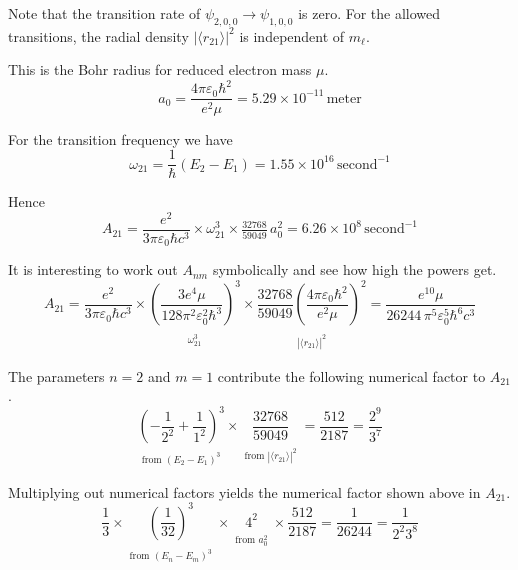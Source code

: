 \documentclass[12pt]{article}
\begin{document}
\medskip
\noindent
Note that the transition rate of $\psi_{2,0,0}\rightarrow\psi_{1,0,0}$ is zero.
For the allowed transitions, the radial density
$|\langle r_{21}\rangle|^2$ is independent of $m_\ell$.

\bigskip
\noindent
This is the Bohr radius for reduced electron mass $\mu$.
\begin{equation*}
a_0=\frac{4\pi\varepsilon_0\hbar^2}{e^2 \mu}
=5.29\times10^{-11}\,\text{meter}
\end{equation*}

\bigskip
\noindent
For the transition frequency we have
\begin{equation*}
\omega_{21}=\frac{1}{\hbar}(E_2-E_1)
=1.55\times10^{16}\,\text{second}^{-1}
\end{equation*}

\noindent
Hence
\begin{equation*}
A_{21}=\frac{e^2}{3\pi\varepsilon_0\hbar c^3}
\times
\omega_{21}^3
\times
\tfrac{32768}{59049}\,a_0^2
=6.26\times10^8\,\text{second}^{-1}
\end{equation*}

\noindent
It is interesting to work out $A_{nm}$ symbolically and see how high the powers get.
\begin{equation*}
A_{21}=\frac{e^2}{3\pi\varepsilon_0\hbar c^3}
\times
\underset{\substack{\\[1ex]\omega_{21}^3}}
{\left(\frac{3e^4\mu}{128\pi^2\varepsilon_0^2\hbar^3}\right)^3}
\times
\underset{\substack{\\[1ex]|\langle r_{21}\rangle|^2}}
{\frac{32768}{59049}
\left(\frac{4\pi\varepsilon_0\hbar^2}{e^2\mu}\right)^2}
=\frac{e^{10}\mu}{26244\,\pi^5\varepsilon_0^5\hbar^6 c^3}
\end{equation*}

\noindent
The parameters $n=2$ and $m=1$ contribute the following numerical factor to $A_{21}$.
\begin{equation*}
\underset{\substack{\\[1ex]\text{from $(E_2-E_1)^3$}}}
{\left(-\frac{1}{2^2}+\frac{1}{1^2}\right)^3}
\times
\underset{\substack{\\[1ex]\text{from $|\langle r_{21}\rangle|^2$}}}
{\frac{32768}{59049}}
=\frac{512}{2187}=\frac{2^9}{3^7}
\end{equation*}

\noindent
Multiplying out numerical factors yields the numerical factor shown above in $A_{21}$.
\begin{equation*}
\frac{1}{3}
\times
\underset{\substack{\\[1ex]\text{from $(E_n-E_m)^3$}}}
{\left(\frac{1}{32}\right)^3}
\times
\underset{\substack{\\[1ex]\text{from $a_0^2$}}}{4^2}
\times\frac{512}{2187}=\frac{1}{26244}=\frac{1}{2^2 3^8}
\end{equation*}
\end{document}
